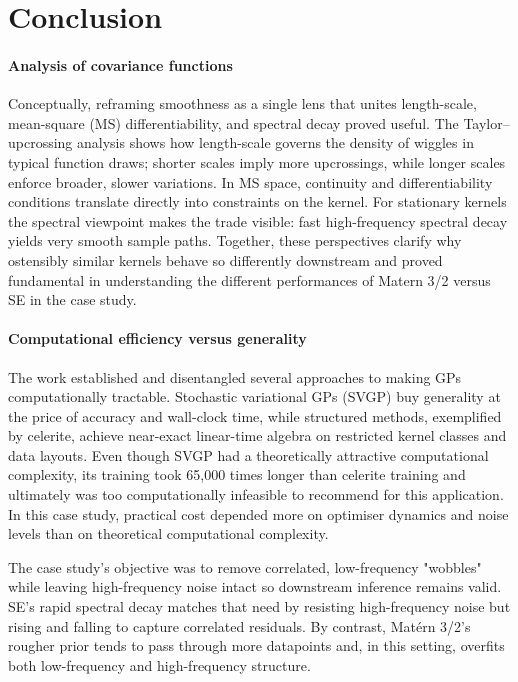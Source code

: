 \section{Conclusion}

\paragraph{Analysis of covariance functions}
Conceptually, reframing smoothness as a single lens that unites length-scale, mean-square (MS) differentiability, and spectral decay proved useful. The Taylor–upcrossing analysis shows how length-scale governs the density of wiggles in typical function draws; shorter scales imply more upcrossings, while longer scales enforce broader, slower variations. In MS space, continuity and differentiability conditions translate directly into constraints on the kernel. For stationary kernels the spectral viewpoint makes the trade visible: fast high-frequency spectral decay yields very smooth sample paths. Together, these perspectives clarify why ostensibly similar kernels behave so differently downstream and proved fundamental in understanding the different performances of Matern 3/2 versus SE in the case study.

\paragraph{Computational efficiency versus generality}
The work established and disentangled several approaches to making GPs computationally tractable. Stochastic variational GPs (SVGP) buy generality at the price of accuracy and wall-clock time, while structured methods, exemplified by celerite, achieve near-exact linear-time algebra on restricted kernel classes and data layouts. Even though SVGP had a theoretically attractive computational complexity, its training took 65,000 times longer than celerite training and ultimately was too computationally infeasible to recommend for this application. In this case study, practical cost depended more on optimiser dynamics and noise levels than on theoretical computational complexity.

The case study's objective was to remove correlated, low-frequency "wobbles" while leaving high-frequency noise intact so downstream inference remains valid. SE's rapid spectral decay matches that need by resisting high-frequency noise but rising and falling to capture correlated residuals. By contrast, Matérn 3/2's rougher prior tends to pass through more datapoints and, in this setting, overfits both low-frequency and high-frequency structure. 

